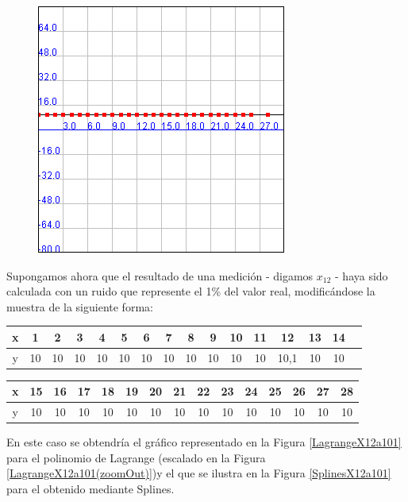 \documentclass[a4paper]{article}
\begin{document}
\begin{figure}[h!]
	\caption{}
	\begin{center}
	\includegraphics[scale=1]{imagenes/LagrangeSplinesCTE}
	\label{LagrangeSplinesCTE}
  \end{center}
\end{figure}

Supongamos ahora que el resultado de una medición - digamos $x_{12}$ - haya sido calculada con un ruido que represente el 1\% del valor real, modificándose la muestra de la siguiente forma:\\

\smallskip

\begin{tabular}{ | c || c | c | c | c | c |c | c | c | c | c | c | c | c | c | c |}
 \hline                 
   x & 1 & 2 & 3 & 4 & 5 & 6 & 7 & 8 & 9 & 10 & 11 & 12 & 13 & 14 \\
 \hline    
y & 10 & 10& 10& 10& 10& 10& 10& 10& 10& 10& 10& 10,1& 10 & 10\\
 \hline  
 \end{tabular}

 \smallskip

\begin{tabular}{  | c || c | c | c | c | c | c | c | c | c | c | c | c | c | c | }
 \hline                 
   x&15& 16 & 17 & 18 & 19 & 20 & 21 & 22 & 23 & 24 & 25 & 26 & 27 & 28\\
 \hline    
y & 10 & 10 & 10& 10& 10& 10& 10& 10& 10& 10& 10& 10& 10& 10 \\
 \hline  
 \end{tabular}

\smallskip
 En este caso se obtendría el gráfico representado en la Figura \ref{LagrangeX12a101} para el polinomio de Lagrange (escalado en la Figura \ref{LagrangeX12a101(zoomOut)})y el que se ilustra en la Figura \ref{SplinesX12a101} para el obtenido mediante Splines.\\
\end{document}
